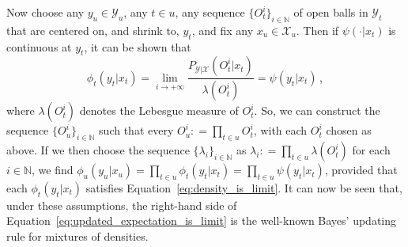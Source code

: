\documentclass[twoside,11pt]{article}
\newcommand{\nats}{\mathbb{N}}
\newcommand{\states}{\mathcal{X}}
\newcommand{\observs}{\mathcal{Y}}
\newcommand{\coloneqq}{:\!=}
\begin{document}
Now choose any $y_u\in\observs_u$, any $t\in u$, any sequence $\{O_t^i\}_{i\in\nats}$ of open balls in $\observs_t$ that are centered on, and shrink to, $y_t$, and fix any $x_u\in\states_u$. Then if $\psi(\cdot\vert x_t)$ is continuous at $y_t$, it can be shown that
\begin{equation}\label{eq:density_is_limit}
\phi_t(y_t\vert x_t) = \lim_{i\to+\infty} \frac{P_{\observs\vert\states}(O_t^i\vert x_t)}{\lambda(O_t^i)} = \psi(y_t\vert x_t)\,,
\end{equation}
where $\lambda(O_t^i)$ denotes the Lebesgue measure of $O_t^i$. So, we can construct the sequence $\{O_u^i\}_{i\in\nats}$ such that every $O_u^i\coloneqq \prod_{t\in u}O_t^i$, with each $O_t^i$ chosen as above. If we then choose the sequence $\{\lambda_i\}_{i\in\nats}$ as $\lambda_i\coloneqq \prod_{t\in u}\lambda(O_t^i)$ for each $i\in\nats$, we find 
$\phi_u(y_u\vert x_u) = \prod_{t\in u}\phi_t(y_t\vert x_t)=\prod_{t\in u}\psi(y_t\vert x_t)$, 
provided that each $\phi_t(y_t\vert x_t)$ satisfies Equation~\eqref{eq:density_is_limit}. %
%
It can now be seen that, under these assumptions, the right-hand side of Equation~\eqref{eq:updated_expectation_is_limit} is the well-known Bayes' updating rule for mixtures of densities. 
\end{document}
